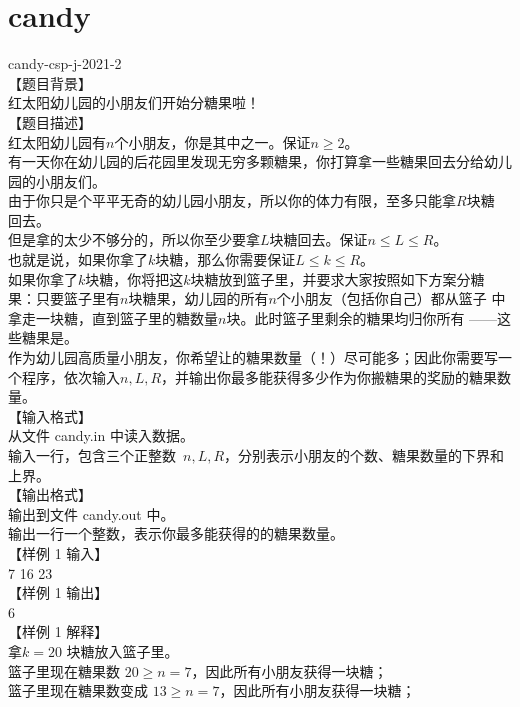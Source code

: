 \documentclass[12pt,twiside,a4paper]{ctexbook}
\numberwithin{chapter}{part}
\begin{document}
\section{candy}
candy-csp-j-2021-2\\
【题目背景】\\
红太阳幼儿园的小朋友们开始分糖果啦！\\
【题目描述】\\
红太阳幼儿园有$n$个小朋友，你是其中之一。保证$n\geq2$。\\
有一天你在幼儿园的后花园里发现无穷多颗糖果，你打算拿一些糖果回去分给幼儿
园的小朋友们。\\
由于你只是个平平无奇的幼儿园小朋友，所以你的体力有限，至多只能拿$R$块糖
回去。\\
但是拿的太少不够分的，所以你至少要拿$L$块糖回去。保证$n\leq L\leq R$。\\
也就是说，如果你拿了$k$块糖，那么你需要保证$L\leq k\leq R$。\\
如果你拿了$k$块糖，你将把这$k$块糖放到篮子里，并要求大家按照如下方案分糖
果：只要篮子里有$n$块糖果，幼儿园的所有$n$个小朋友（包括你自己）都从篮子
中拿走一块糖，直到篮子里的糖数量$n$块。此时篮子里剩余的糖果均归你所有
——这些糖果是。\\
作为幼儿园高质量小朋友，你希望让的糖果数量（！）尽可能多；因此你需要写一个程序，依次输入$n, L, R$，并输出你最多能获得多少作为你搬糖果的奖励的糖果数量。\\
【输入格式】\\
从文件 candy.in 中读入数据。\\
输入一行，包含三个正整数 $n, L, R$，分别表示小朋友的个数、糖果数量的下界和上界。\\
【输出格式】\\
输出到文件 candy.out 中。\\
输出一行一个整数，表示你最多能获得的的糖果数量。\\
【样例 1 输入】\\
7 16 23\\
【样例 1 输出】\\
6\\
【样例 1 解释】\\
拿$k = 20$ 块糖放入篮子里。\\
篮子里现在糖果数 $20 \geq n = 7$，因此所有小朋友获得一块糖；\\
篮子里现在糖果数变成 $13 \geq n = 7$，因此所有小朋友获得一块糖；\\
\end{document}
